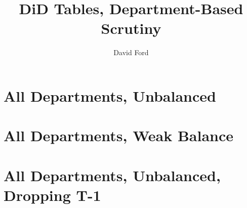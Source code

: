 \documentclass[12pt,a4paper]{article}
\begin{document}

\title{DiD Tables, Department-Based Scrutiny}
\author{David Ford}
\maketitle


\pagebreak

\section{All Departments, Unbalanced}

\begin{center}

\end{center}

\begin{center}

\end{center}

\pagebreak

\section{All Departments, Weak Balance}

\begin{center}

\end{center}

\begin{center}

\end{center}

\pagebreak

\section{All Departments, Unbalanced, Dropping T-1}

\begin{center}

\end{center}
\end{document}
